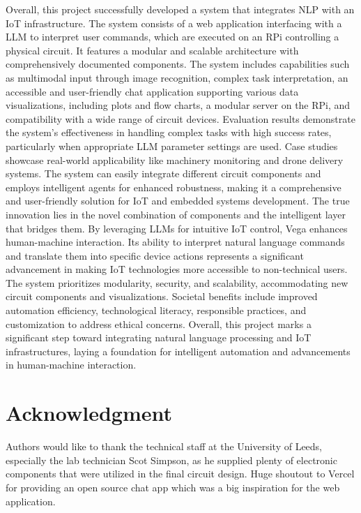 \documentclass{ieeeaccess}
\begin{document}
Overall, this project successfully developed a system that integrates NLP with an IoT infrastructure. The system consists of a web application interfacing with a LLM to interpret user commands, which are executed on an RPi controlling a physical circuit. It features a modular and scalable architecture with comprehensively documented components. The system includes capabilities such as multimodal input through image recognition, complex task interpretation, an accessible and user-friendly chat application supporting various data visualizations, including plots and flow charts, a modular server on the RPi, and compatibility with a wide range of circuit devices. Evaluation results demonstrate the system's effectiveness in handling complex tasks with high success rates, particularly when appropriate LLM parameter settings are used. Case studies showcase real-world applicability like machinery monitoring and drone delivery systems. The system can easily integrate different circuit components and employs intelligent agents for enhanced robustness, making it a comprehensive and user-friendly solution for IoT and embedded systems development. The true innovation lies in the novel combination of components and the intelligent layer that bridges them. By leveraging LLMs for intuitive IoT control, Vega enhances human-machine interaction. Its ability to interpret natural language commands and translate them into specific device actions represents a significant advancement in making IoT technologies more accessible to non-technical users. The system prioritizes modularity, security, and scalability, accommodating new circuit components and visualizations. Societal benefits include improved automation efficiency, technological literacy, responsible practices, and customization to address ethical concerns. Overall, this project marks a significant step toward integrating natural language processing and IoT infrastructures, laying a foundation for intelligent automation and advancements in human-machine interaction.

\section*{Acknowledgment}
Authors would like to thank the technical staff at the University of Leeds, especially the lab technician Scot Simpson, as he supplied plenty of electronic components that were utilized in the final circuit design. Huge shoutout to Vercel for providing an open source chat app which was a big inspiration for the web application.
\end{document}
